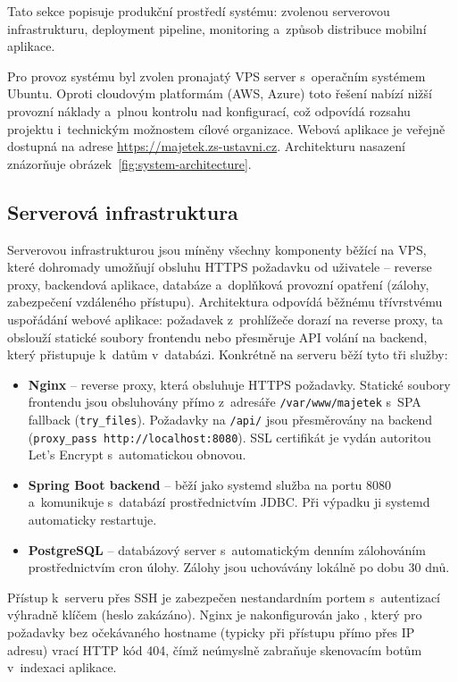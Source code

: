 Tato sekce popisuje produkční prostředí systému: zvolenou serverovou infrastrukturu, deployment pipeline, monitoring a~způsob distribuce mobilní aplikace.

Pro provoz systému byl zvolen pronajatý VPS server s~operačním systémem Ubuntu. Oproti cloudovým platformám (AWS, Azure) toto řešení nabízí nižší provozní náklady a~plnou kontrolu nad konfigurací, což odpovídá rozsahu projektu i~technickým možnostem cílové organizace. Webová aplikace je veřejně dostupná na adrese \url{https://majetek.zs-ustavni.cz}. Architekturu nasazení znázorňuje obrázek~\ref{fig:system-architecture}.

\subsection{Serverová infrastruktura}

Serverovou infrastrukturou jsou míněny všechny komponenty běžící na VPS, které dohromady umožňují obsluhu HTTPS požadavku od uživatele -- reverse proxy, backendová aplikace, databáze a~doplňková provozní opatření (zálohy, zabezpečení vzdáleného přístupu). Architektura odpovídá běžnému třívrstvému uspořádání webové aplikace: požadavek z~prohlížeče dorazí na reverse proxy, ta obslouží statické soubory frontendu nebo přesměruje API volání na backend, který přistupuje k~datům v~databázi. Konkrétně na serveru běží tyto tři služby:

\begin{itemize}
	\item \textbf{Nginx} -- reverse proxy, která obsluhuje HTTPS požadavky. Statické soubory frontendu jsou obsluhovány přímo z~adresáře \texttt{/var/www/majetek} s~SPA fallback (\texttt{try\_files}). Požadavky na \texttt{/api/} jsou přesměrovány na backend (\texttt{proxy\_pass http://localhost:8080}). SSL certifikát je vydán autoritou Let's Encrypt s~automatickou obnovou.
	\item \textbf{Spring Boot backend} -- běží jako systemd služba na portu 8080 a~komunikuje s~databází prostřednictvím JDBC. Při výpadku ji systemd automaticky restartuje.
	\item \textbf{PostgreSQL} -- databázový server s~automatickým denním zálohováním prostřednictvím cron úlohy. Zálohy jsou uchovávány lokálně po dobu 30 dnů.
\end{itemize}

Přístup k~serveru přes SSH je zabezpečen nestandardním portem s~autentizací výhradně klíčem (heslo zakázáno). Nginx je nakonfigurován jako , který pro požadavky bez očekávaného hostname (typicky při přístupu přímo přes IP adresu) vrací HTTP kód 404, čímž neúmyslně zabraňuje skenovacím botům v~indexaci aplikace.


